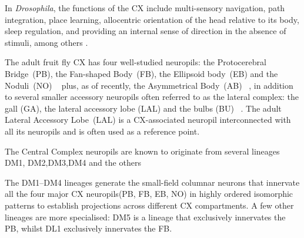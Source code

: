         In \textit{Drosophila}, the functions of the CX include multi-sensory navigation, path integration, place learning, allocentric orientation of the head relative to its body, sleep regulation, and providing an internal sense of direction in the absence of stimuli, among others \citep{hanesch1989neuronal, ofstad2011visual, seelig2013feature, PfeifferHomberg2014, Stone2017CXModel, franconville2018building, heinze2018principles, szuperak2018sleep, pisokas2020head, ShaferKeene2021sleep, fisher2022flexible}.

        The adult fruit fly CX has four well-studied neuropils: the Protocerebral Bridge~(PB), the Fan-shaped Body~(FB), the Ellipsoid body~(EB) and the Noduli~(NO) ~\citep{hanesch1989neuronal} plus, as of recently, the Asymmetrical Body~(AB) ~\citep{wolff2018neuroarchitecture}, in addition to several smaller accessory neuropils often referred to as the lateral complex: the gall (GA), the lateral accessory lobe (LAL) and the bulbs (BU)  ~\citep{wolff2015neuroarchitecture, franconville2018building, hulse2021connectome}. The adult Lateral Accessory Lobe~(LAL) is a CX-associated neuropil interconnected with all its neuropils \citep{hulse2021connectome} and is often used as a reference point.
        


        The Central Complex neuropils are known to originate from several lineages DM1, DM2,DM3,DM4 and the others \citep{}

        The DM1–DM4 lineages generate the small-field columnar neurons that innervate all the four major CX neuropils(PB, FB, EB, NO) in highly ordered isomorphic patterns to establish projections across different CX compartments. 
        A few other lineages are more specialised: DM5 is a lineage that exclusively innervates the PB, whilst DL1  exclusively innervates the FB. 


        

